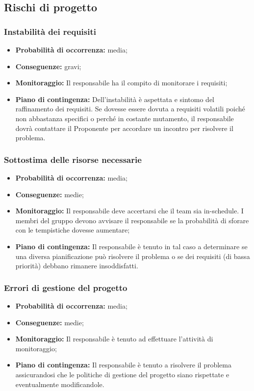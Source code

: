 \subsection{Rischi di progetto}
\subsubsection{Instabilità dei requisiti}
\begin{itemize}
\item \textbf{Probabilità di occorrenza:} media;
\item \textbf{Conseguenze:} gravi;
\item \textbf{Monitoraggio:} Il responsabile ha il compito di monitorare i requisiti;
\item \textbf{Piano di contingenza:} Dell'instabilità è aspettata e sintomo del raffinamento dei requisiti.	Se dovesse essere dovuta a requisiti volatili poiché non abbastanza specifici o perché in costante mutamento, il responsabile dovrà contattare il Proponente per accordare un incontro per risolvere il problema.
\end{itemize}
\subsubsection{Sottostima delle risorse necessarie}
\begin{itemize}
\item \textbf{Probabilità di occorrenza:} media;
\item \textbf{Conseguenze:} medie;
\item \textbf{Monitoraggio:} Il responsabile deve accertarsi che il team sia in-schedule. I membri del gruppo devono avvisare il responsabile se la probabilità di sforare con le tempistiche dovesse aumentare;
\item \textbf{Piano di contingenza:} Il responsabile è tenuto in tal caso a determinare se una diversa pianificazione può risolvere il problema o se dei requisiti (di bassa priorità) debbano rimanere insoddisfatti.
\end{itemize}
\subsubsection{Errori di gestione del progetto}
\begin{itemize}
\item \textbf{Probabilità di occorrenza:} media;
\item \textbf{Conseguenze:} medie;
\item \textbf{Monitoraggio:} Il responsabile è tenuto ad effettuare l'attività di monitoraggio;
\item \textbf{Piano di contingenza:} Il responsabile è tenuto a risolvere il problema assicurandosi che le politiche di gestione del progetto siano rispettate e eventualmente modificandole.
\end{itemize}
\pagebreak